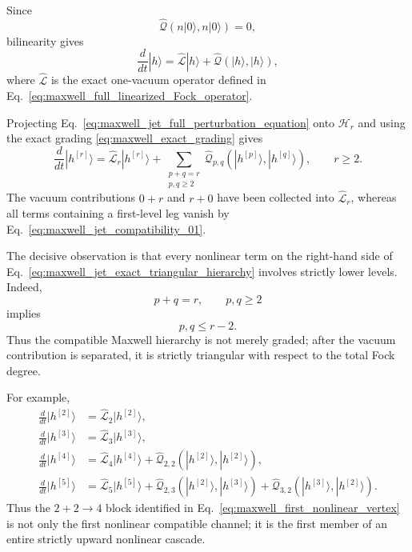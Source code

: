 \documentclass[11pt,oneside]{article}
\numberwithin{equation}{section}
\theoremstyle{definition}
\begin{document}
Since
\begin{equation}
\widehat{\mathcal Q}(n|0\rangle,n|0\rangle)=0,
\end{equation}
bilinearity gives
\begin{equation}
\frac{d}{dt}|h\rangle
=
\widehat{\mathcal L}|h\rangle
+
\widehat{\mathcal Q}(|h\rangle,|h\rangle),
\label{eq:maxwell_jet_full_perturbation_equation}
\end{equation}
where $\widehat{\mathcal L}$ is the exact one-vacuum operator defined in
Eq.~\eqref{eq:maxwell_full_linearized_Fock_operator}.

Projecting Eq.~\eqref{eq:maxwell_jet_full_perturbation_equation} onto
$\mathscr H_r$ and using the exact grading
\eqref{eq:maxwell_exact_grading} gives
\begin{equation}
\boxed{
\frac{d}{dt}|h^{[r]}\rangle
=
\widehat{\mathcal L}_r|h^{[r]}\rangle
+
\sum_{\substack{p+q=r\\p,q\geq2}}
\widehat{\mathcal Q}_{p,q}
\left(
|h^{[p]}\rangle,
|h^{[q]}\rangle
\right),
\qquad r\geq2.
}
\label{eq:maxwell_jet_exact_triangular_hierarchy}
\end{equation}
The vacuum contributions $0+r$ and $r+0$ have been collected into
$\widehat{\mathcal L}_r$, whereas all terms containing a first-level leg
vanish by Eq.~\eqref{eq:maxwell_jet_compatibility_01}.

The decisive observation is that every nonlinear term on the right-hand
side of Eq.~\eqref{eq:maxwell_jet_exact_triangular_hierarchy} involves
strictly lower levels.  Indeed,
\begin{equation}
p+q=r,
\qquad
p,q\geq2
\end{equation}
implies
\begin{equation}
p,q\leq r-2.
\label{eq:maxwell_jet_strict_triangularity}
\end{equation}
Thus the compatible Maxwell hierarchy is not merely graded; after the
vacuum contribution is separated, it is strictly triangular with respect
to the total Fock degree.

For example,
\begin{align}
\frac{d}{dt}|h^{[2]}\rangle
&=
\widehat{\mathcal L}_2|h^{[2]}\rangle,
\label{eq:maxwell_jet_level2}
\\
\frac{d}{dt}|h^{[3]}\rangle
&=
\widehat{\mathcal L}_3|h^{[3]}\rangle,
\label{eq:maxwell_jet_level3}
\\
\frac{d}{dt}|h^{[4]}\rangle
&=
\widehat{\mathcal L}_4|h^{[4]}\rangle
+
\widehat{\mathcal Q}_{2,2}
\left(
|h^{[2]}\rangle,
|h^{[2]}\rangle
\right),
\label{eq:maxwell_jet_level4}
\\
\frac{d}{dt}|h^{[5]}\rangle
&=
\widehat{\mathcal L}_5|h^{[5]}\rangle
+
\widehat{\mathcal Q}_{2,3}
\left(
|h^{[2]}\rangle,
|h^{[3]}\rangle
\right)
+
\widehat{\mathcal Q}_{3,2}
\left(
|h^{[3]}\rangle,
|h^{[2]}\rangle
\right).
\label{eq:maxwell_jet_level5}
\end{align}
Thus the $2+2\to4$ block identified in
Eq.~\eqref{eq:maxwell_first_nonlinear_vertex} is not only the first
nonlinear compatible channel; it is the first member of an entire
strictly upward nonlinear cascade.
\end{document}
